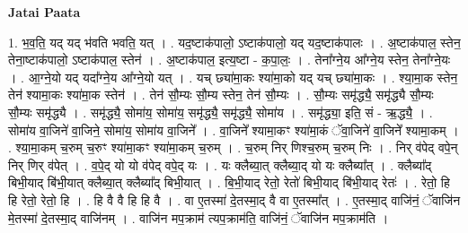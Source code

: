 \documentclass[17pt]{extarticle}
\begin{document}
\textbf{Jatai Paata} \newline

1. भ॒व॒ति॒ यद् यद् भ॑वति भवति॒ यत् । . यद॒ष्टाक॑पालो॒ ऽष्टाक॑पालो॒ यद् यद॒ष्टाक॑पालः । . अ॒ष्टाक॑पाल॒ स्तेन॒ तेना॒ष्टाक॑पालो॒ ऽष्टाक॑पाल॒ स्तेन॑ । . अ॒ष्टाक॑पाल॒ इत्य॒ष्टा - क॒पा॒लः॒ । . तेना᳚ग्ने॒य आ᳚ग्ने॒य स्तेन॒ तेना᳚ग्ने॒यः । . आ॒ग्ने॒यो यद् यदा᳚ग्ने॒य आ᳚ग्ने॒यो यत् । . यच् छ्या॑मा॒कः श्या॑मा॒को यद् यच् छ्या॑मा॒कः । . श्या॒मा॒क स्तेन॒ तेन॑ श्यामा॒कः श्या॑मा॒क स्तेन॑ । . तेन॑ सौ॒म्यः सौ॒म्य स्तेन॒ तेन॑ सौ॒म्यः । . सौ॒म्यः समृ॑द्ध्यै॒ समृ॑द्ध्यै सौ॒म्यः सौ॒म्यः समृ॑द्ध्यै । . समृ॑द्ध्यै॒ सोमा॑य॒ सोमा॑य॒ समृ॑द्ध्यै॒ समृ॑द्ध्यै॒ सोमा॑य । . समृ॑द्ध्या॒ इति॒ सं - ऋ॒द्ध्यै॒ । . सोमा॑य वा॒जिने॑ वा॒जिने॒ सोमा॑य॒ सोमा॑य वा॒जिने᳚ । . वा॒जिने᳚ श्यामा॒कꣳ श्या॑मा॒कं ॅवा॒जिने॑ वा॒जिने᳚ श्यामा॒कम् । . श्या॒मा॒कम् च॒रुम् च॒रुꣳ श्या॑मा॒कꣳ श्या॑मा॒कम् च॒रुम् । . च॒रुम् निर् णिश्च॒रुम् च॒रुम् निः । . निर् व॑पेद् वपे॒न् निर् णिर् व॑पेत् । . व॒पे॒द् यो यो व॑पेद् वपे॒द् यः । . यः क्लैब्या॒त् क्लैब्या॒द् यो यः क्लैब्या᳚त् । . क्लैब्या᳚द् बिभी॒याद् बि॑भी॒यात् क्लैब्या॒त् क्लैब्या᳚द् बिभी॒यात् । . बि॒भी॒याद् रेतो॒ रेतो॑ बिभी॒याद् बि॑भी॒याद् रेतः॑ । . रेतो॒ हि हि रेतो॒ रेतो॒ हि । . हि वै वै हि हि वै । . वा ए॒तस्मा॑ दे॒तस्मा॒द् वै वा ए॒तस्मा᳚त् । . ए॒तस्मा॒द् वाजि॑नं॒ ॅवाजि॑न मे॒तस्मा॑ दे॒तस्मा॒द् वाजि॑नम् । . वाजि॑न मप॒क्राम॑ त्यप॒क्राम॑ति॒ वाजि॑नं॒ ॅवाजि॑न मप॒क्राम॑ति । \newline
\end{document}
